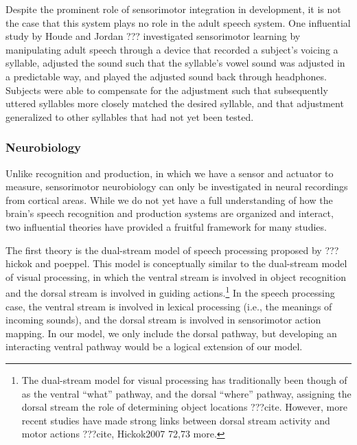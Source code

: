 Despite the prominent role of sensorimotor integration
in development,
it is not the case that this system
plays no role in the adult speech system.
One influential study by Houde and Jordan ???
investigated sensorimotor learning
by manipulating adult speech
through a device that recorded
a subject's voicing a syllable,
adjusted the sound such that the syllable's vowel sound
was adjusted in a predictable way,
and played the adjusted sound back through headphones.
Subjects were able to compensate
for the adjustment such that
subsequently uttered syllables
more closely matched the desired syllable,
and that adjustment generalized
to other syllables that had not yet
been tested.

\subsubsection{Neurobiology}

Unlike recognition and production,
in which we have a sensor and actuator to measure,
sensorimotor neurobiology
can only be investigated
in neural recordings from cortical areas.
While we do not yet
have a full understanding of
how the brain's speech recognition
and production systems are organized
and interact,
two influential theories have provided
a fruitful framework for many studies.

The first theory
is the dual-stream model of speech processing
proposed by ??? hickok and poeppel.
This model is conceptually similar
to the dual-stream model of visual processing,
in which the ventral stream
is involved in object recognition
and the dorsal stream is involved
in guiding actions.\footnote{The dual-stream
  model for visual processing has traditionally
  been though of as the ventral ``what'' pathway,
  and the dorsal ``where'' pathway,
  assigning the dorsal stream
  the role of determining object locations
  ???cite.
  However, more recent studies have made
  strong links between dorsal stream
  activity and motor actions ???cite, Hickok2007 72,73
  more.}
In the speech processing case,
the ventral stream
is involved in lexical processing
(i.e., the meanings of incoming sounds),
and the dorsal stream
is involved in sensorimotor action mapping.
In our model, we only include
the dorsal pathway,
but developing an
interacting ventral pathway
would be a logical extension of our model.

